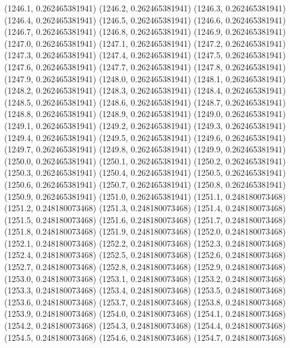 {					(1246.1, 0.262465381941)
					(1246.2, 0.262465381941)
					(1246.3, 0.262465381941)
					(1246.4, 0.262465381941)
					(1246.5, 0.262465381941)
					(1246.6, 0.262465381941)
					(1246.7, 0.262465381941)
					(1246.8, 0.262465381941)
					(1246.9, 0.262465381941)
					(1247.0, 0.262465381941)
					(1247.1, 0.262465381941)
					(1247.2, 0.262465381941)
					(1247.3, 0.262465381941)
					(1247.4, 0.262465381941)
					(1247.5, 0.262465381941)
					(1247.6, 0.262465381941)
					(1247.7, 0.262465381941)
					(1247.8, 0.262465381941)
					(1247.9, 0.262465381941)
					(1248.0, 0.262465381941)
					(1248.1, 0.262465381941)
					(1248.2, 0.262465381941)
					(1248.3, 0.262465381941)
					(1248.4, 0.262465381941)
					(1248.5, 0.262465381941)
					(1248.6, 0.262465381941)
					(1248.7, 0.262465381941)
					(1248.8, 0.262465381941)
					(1248.9, 0.262465381941)
					(1249.0, 0.262465381941)
					(1249.1, 0.262465381941)
					(1249.2, 0.262465381941)
					(1249.3, 0.262465381941)
					(1249.4, 0.262465381941)
					(1249.5, 0.262465381941)
					(1249.6, 0.262465381941)
					(1249.7, 0.262465381941)
					(1249.8, 0.262465381941)
					(1249.9, 0.262465381941)
					(1250.0, 0.262465381941)
					(1250.1, 0.262465381941)
					(1250.2, 0.262465381941)
					(1250.3, 0.262465381941)
					(1250.4, 0.262465381941)
					(1250.5, 0.262465381941)
					(1250.6, 0.262465381941)
					(1250.7, 0.262465381941)
					(1250.8, 0.262465381941)
					(1250.9, 0.262465381941)
					(1251.0, 0.262465381941)
					(1251.1, 0.248180073468)
					(1251.2, 0.248180073468)
					(1251.3, 0.248180073468)
					(1251.4, 0.248180073468)
					(1251.5, 0.248180073468)
					(1251.6, 0.248180073468)
					(1251.7, 0.248180073468)
					(1251.8, 0.248180073468)
					(1251.9, 0.248180073468)
					(1252.0, 0.248180073468)
					(1252.1, 0.248180073468)
					(1252.2, 0.248180073468)
					(1252.3, 0.248180073468)
					(1252.4, 0.248180073468)
					(1252.5, 0.248180073468)
					(1252.6, 0.248180073468)
					(1252.7, 0.248180073468)
					(1252.8, 0.248180073468)
					(1252.9, 0.248180073468)
					(1253.0, 0.248180073468)
					(1253.1, 0.248180073468)
					(1253.2, 0.248180073468)
					(1253.3, 0.248180073468)
					(1253.4, 0.248180073468)
					(1253.5, 0.248180073468)
					(1253.6, 0.248180073468)
					(1253.7, 0.248180073468)
					(1253.8, 0.248180073468)
					(1253.9, 0.248180073468)
					(1254.0, 0.248180073468)
					(1254.1, 0.248180073468)
					(1254.2, 0.248180073468)
					(1254.3, 0.248180073468)
					(1254.4, 0.248180073468)
					(1254.5, 0.248180073468)
					(1254.6, 0.248180073468)
					(1254.7, 0.248180073468)
}
